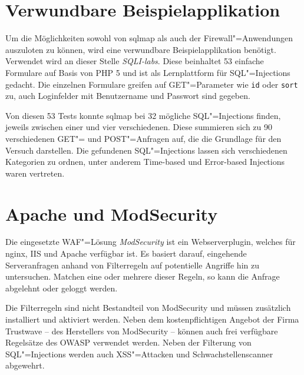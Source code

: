 \section{Verwundbare Beispielapplikation}

Um die Möglichkeiten sowohl von sqlmap als auch der Firewall"=Anwendungen auszuloten zu können, wird eine verwundbare Beispielapplikation benötigt. Verwendet wird an dieser Stelle \emph{SQLI-labs}. Diese beinhaltet 53 einfache Formulare auf Basis von PHP 5 und ist als Lernplattform für SQL"=Injections gedacht. Die einzelnen Formulare greifen auf GET"=Parameter wie \texttt{id} oder \texttt{sort} zu, auch Loginfelder mit Benutzername und Passwort sind gegeben.

Von diesen 53 Tests konnte sqlmap bei 32 mögliche SQL"=Injections finden, jeweils zwischen einer und vier verschiedenen. Diese summieren sich zu 90 verschiedenen GET"= und POST"=Anfragen auf, die die Grundlage für den Versuch darstellen. Die gefundenen SQL"=Injections lassen sich verschiedenen Kategorien zu ordnen, unter anderem Time-based und Error-based Injections waren vertreten.

\section{Apache und ModSecurity}
\label{sec:modsecurity}

Die eingesetzte WAF"=Lösung \emph{ModSecurity} ist ein Webserverplugin, welches für nginx, IIS und Apache verfügbar ist. Es basiert darauf, eingehende Serveranfragen anhand von Filterregeln auf potentielle Angriffe hin zu untersuchen. Matchen eine oder mehrere dieser Regeln, so kann die Anfrage abgelehnt oder geloggt werden.

Die Filterregeln sind nicht Bestandteil von ModSecurity und müssen zusätzlich installiert und aktiviert werden. Neben dem kostenpflichtigen Angebot der Firma Trustwave -- des Herstellers von ModSecurity -- können auch frei verfügbare Regelsätze des OWASP verwendet werden. Neben der Filterung von SQL"=Injections werden auch XSS"=Attacken und Schwachstellenscanner abgewehrt.

